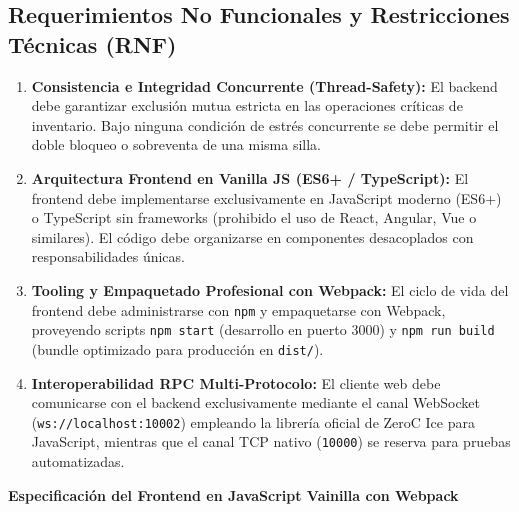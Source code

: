 \documentclass[10pt,letterpaper]{article}
\newcommand{\sectionBadge}[1]{%
  \refstepcounter{section}%
  \vspace{0.24cm}%
  \noindent%
  \colorbox{icesiBlue}{\color{white}\rule[-0.08cm]{0pt}{0.42cm}\hspace{0.16cm}\textbf{\normalsize \thesection}\hspace{0.16cm}}%
  \hspace{0.18cm}%
  {\fontsize{9.5}{12}\selectfont\textbf{\color{icesiDark}#1}}\\[-0.10cm]%
  \noindent{\color{icesiDark}\rule{\textwidth}{0.8pt}}\vspace{0.10cm}%
}
\begin{document}
\subsection{Requerimientos No Funcionales y Restricciones Técnicas (RNF)}
\begin{enumerate}[label=\textbf{RNF-\arabic*:}, leftmargin=*]
  \item \textbf{Consistencia e Integridad Concurrente (Thread-Safety):} El backend debe garantizar exclusión mutua estricta en las operaciones críticas de inventario. Bajo ninguna condición de estrés concurrente se debe permitir el doble bloqueo o sobreventa de una misma silla.
  \item \textbf{Arquitectura Frontend en Vanilla JS (ES6+ / TypeScript):} El frontend debe implementarse exclusivamente en JavaScript moderno (ES6+) o TypeScript sin frameworks (prohibido el uso de React, Angular, Vue o similares). El código debe organizarse en componentes desacoplados con responsabilidades únicas.
  \item \textbf{Tooling y Empaquetado Profesional con Webpack:} El ciclo de vida del frontend debe administrarse con \texttt{npm} y empaquetarse con Webpack, proveyendo scripts \texttt{npm start} (desarrollo en puerto 3000) y \texttt{npm run build} (bundle optimizado para producción en \texttt{dist/}).
  \item \textbf{Interoperabilidad RPC Multi-Protocolo:} El cliente web debe comunicarse con el backend exclusivamente mediante el canal WebSocket (\texttt{ws://localhost:10002}) empleando la librería oficial de ZeroC Ice para JavaScript, mientras que el canal TCP nativo (\texttt{10000}) se reserva para pruebas automatizadas.
\end{enumerate}

\vspace{4pt}

\sectionBadge{Especificación del Frontend en JavaScript Vainilla con Webpack}
\end{document}
